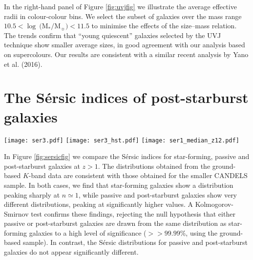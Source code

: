 \documentclass[a4paper,fleqn,usenatbib,useAMS]{mnras}
\begin{document}
In the right-hand panel of Figure \ref{fig:uvjfig} we illustrate the
average effective radii in colour-colour bins.  We select the subset
of galaxies over the mass range $10.5< \log
~($M$_{*}/$M$_{\sun})<11.5$ to minimise the effects of the size--mass
relation.  
The trends
confirm that ``young quiescent'' galaxies selected by the UVJ
technique show smaller average sizes, in good agreement with our
analysis based on supercolours. 
Our results are  consistent with
a similar recent analysis by Yano et al. (2016).


\section{The S\'{e}rsic indices of post-starburst galaxies}
\label{sec:sersic}

\begin{figure*}
	\texttt{[image: ser3.pdf]}
	\texttt{[image: ser3\_hst.pdf]}
	\texttt{[image: ser1\_median\_z12.pdf]}
    \caption{ A comparison of the S\'{e}rsic indices for star-forming,
      passive and post-starburst galaxies in the redshift range
      $1<z<2$ with stellar masses M$_{*}> 10^{10}~$M$_{\sun}$. The
      left panel shows a histogram of S\'{e}rsic indices determined
      from ground-based UDS $K$-band imaging.  The central panel shows
      a histogram of S\'{e}rsic indices determined for the smaller
      sample with available HST $H$-band imaging from CANDELS (from
      van der Wel et al. 2012).  Characteristic uncertainties are
      displayed for each population, showing the median error
      on the fitted S\'{e}rsic index for individual galaxies.  The
      right panel shows median S\'{e}rsic indices as a function of
      stellar mass for the larger $K$-band sample, using identical
      binning to Figure \ref{fig:size-mass}.  We conclude that
      post-starburst galaxies show significantly higher S\'{e}rsic
      indices than star-forming galaxies, but with a distribution that
      is indistinguishable from the older passive population.  }
    \label{fig:sersicfig}
\end{figure*}



In Figure \ref{fig:sersicfig} we compare the S\'{e}rsic indices for
star-forming, passive and post-starburst galaxies at $z>1$. The
distributions obtained from the ground-based $K$-band data are
consistent with those obtained for the smaller CANDELS sample. In both
cases, we find that star-forming galaxies show a distribution peaking
sharply at $n\simeq 1$, while passive and post-starburst galaxies show
very different distributions, peaking at significantly higher values.
A Kolmogorov-Smirnov test confirms these findings, rejecting the null
hypothesis that either passive or post-starburst galaxies are drawn
from the same distribution as star-forming galaxies to a high level of
significance ($>>99.99$\%, using the ground-based sample). In
contrast, the S\'{e}rsic distributions for passive and post-starburst
galaxies do not appear significantly different.
\end{document}
